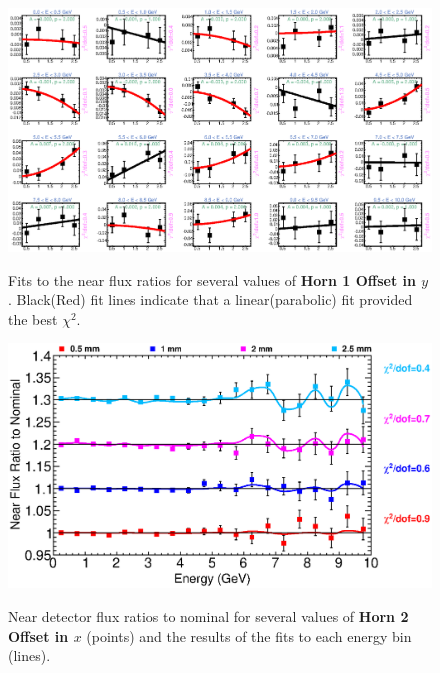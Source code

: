 {\begin{figure}[ht]
  \begin{center}
    {\includegraphics[width=5.0in]{figures/Horn1YOffset_near_fits.eps}}
  \end{center}
\caption{ Fits to the near flux ratios for several values of {\bf Horn 1 Offset in $y$}. Black(Red) fit lines indicate that a linear(parabolic) fit provided the best $\chi^2$. }
\end{figure}

\begin{figure}[ht]
  \begin{center}
    {\includegraphics[width=6.0in]{figures/Horn2XOffset_near_summary.eps}}
  \end{center}
\caption{ Near detector flux ratios to nominal for several values of {\bf Horn 2 Offset in $x$} (points) and the results of the fits to each energy bin (lines).}
\end{figure}

}
